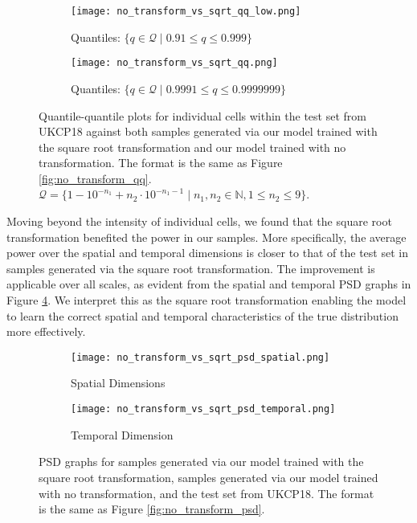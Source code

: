 \documentclass[ oneside,%
                    author={George Herbert},
                    degree={MSci},
                     title={Video Diffusion Models for Climate Simulations},
                  subtitle={}]{dissertation}
\begin{document}
\begin{figure}[htbp]
      \centering
      \begin{subfigure}{0.485\textwidth}
            \texttt{[image: no\_transform\_vs\_sqrt\_qq\_low.png]}
            \caption{Quantiles: $\{q\in\mathcal{Q}\mid 0.91 \le q \le 0.999 \}$}
            \label{fig:no_transform_vs_sqrt_qq_low}
      \end{subfigure}
      \begin{subfigure}{0.495\textwidth}
            \texttt{[image: no\_transform\_vs\_sqrt\_qq.png]}
            \caption{Quantiles: $\{q\in\mathcal{Q}\mid 0.9991 \le q \le 0.9999999 \}$}
            \label{fig:no_transform_vs_sqrt_qq_high}
      \end{subfigure}
      \caption{Quantile-quantile plots for individual cells within the test set from UKCP18 against both samples generated via our model trained with the square root transformation and our model trained with no transformation. The format is the same as Figure \ref{fig:no_transform_qq}. $\mathcal{Q} = \{1 - 10^{-n_1} + n_2 \cdot 10^{-n_1 - 1}\mid n_1,n_2\in \mathbb{N}, 1 \le n_2 \le 9\}$.}
\end{figure}

Moving beyond the intensity of individual cells, we found that the square root transformation benefited the power in our samples. More specifically, the average power over the spatial and temporal dimensions is closer to that of the test set in samples generated via the square root transformation. The improvement is applicable over all scales, as evident from the spatial and temporal PSD graphs in Figure \ref{fig:no_transform_vs_sqrt_psd}. We interpret this as the square root transformation enabling the model to learn the correct spatial and temporal characteristics of the true distribution more effectively.

\begin{figure}[htbp]
      \centering
      \begin{subfigure}{0.49\textwidth}
            \texttt{[image: no\_transform\_vs\_sqrt\_psd\_spatial.png]}
            \caption{Spatial Dimensions}
      \end{subfigure}
      \begin{subfigure}{0.49\textwidth}
            \texttt{[image: no\_transform\_vs\_sqrt\_psd\_temporal.png]}
            \caption{Temporal Dimension}
      \end{subfigure}
      \caption{PSD graphs for samples generated via our model trained with the square root transformation, samples generated via our model trained with no transformation, and the test set from UKCP18. The format is the same as Figure \ref{fig:no_transform_psd}.}
      \label{fig:no_transform_vs_sqrt_psd}
\end{figure}
\end{document}
